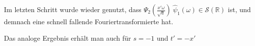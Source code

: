 Im letzten Schritt wurde wieder genutzt, dass
$\Psi_2\left(\frac{x' \omega}{\sqrt{a}}\right) ~\hat \psi_1(\omega) \in \mathcal{S}(\mathbb{R})$
ist, und demnach eine schnell fallende Fouriertransformierte hat.








Das analoge Ergebnis erhält man auch für $s=-1$ und $t' = -x'$
